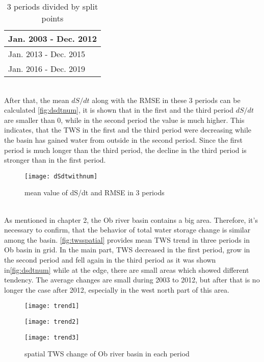 \begin{table}[htbp] \centering
	\begin{tabular}{|l|}
		\hline
		Jan. 2003 - Dec. 2012   \\ \hline 
		Jan. 2013 - Dec. 2015	\\ \hline 
		Jan. 2016 - Dec. 2019	\\ \hline 
	\end{tabular}
	\caption{3 periods divided by split points}
	\label{tab:3periods}
\end{table}\\
After that, the mean $dS/dt$ along with the RMSE in these 3 periods can be calculated \autoref{fig:dsdtnum}, it is shown that in the first and the third period $dS/dt$ are smaller than 0, while in the second period the value is much higher. This indicates, that the TWS in the first and the third period were decreasing while the basin has gained water from outside in the second period. Since the first period is much longer than the third period, the decline in the third period is stronger than in the first period. \\
\begin{figure}[htbp]
	\centering
	\texttt{[image: dSdtwithnum]} 
	\caption{mean value of dS/dt and RMSE in 3 periods} 
	\label{fig:dsdtnum}
\end{figure}\\
As mentioned in chapter 2, the Ob river basin contains a big area. Therefore, it's necessary to confirm, that the behavior of total water storage change is similar among the basin. \autoref{fig:twsspatial} provides mean TWS trend in three periods in Ob basin in grid. In the main part, TWS decreased in the first period, grow in the second period and fell again in the third period as it was shown in\autoref{fig:dsdtnum} while at the edge, there are small areas which showed different tendency. The average changes are small during 2003 to 2012, but after that is no longer the case after 2012, especially in the west north part of this area. 
\begin{figure}[htbp]\centering
	\begin{minipage}[t]{0.3\textwidth}
		\centering
		\texttt{[image: trend1]} %
	\end{minipage}
	\begin{minipage}[t]{0.3\textwidth}
		\centering
		\texttt{[image: trend2]} %
	\end{minipage}
	\begin{minipage}[t]{0.3\textwidth}
		\centering
		\texttt{[image: trend3]} %
	\end{minipage}
	\caption{spatial TWS change of Ob river basin in each period}
	\label{fig:twsspatial}
\end{figure}
